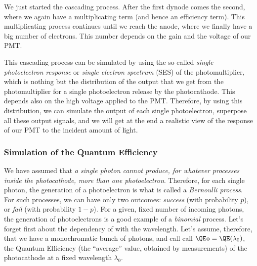 We just started the cascading process. After the first dynode comes
the second, where we again have a multiplicating term (and hence an
efficiency term). This multiplicating process continues until we reach
the anode, where we finally have a big number of electrons. This
number depends on the gain and the voltage of our PMT.

This cascading process can be simulated by using the so called
\emph{single photoelectron response} or \emph{single electron
  spectrum} (SES) of the photomultiplier, which is nothing but the
distribution of the output that we get from the photomultiplier for a
single photoelectron release by the photocathode. This depends also on
the high voltage applied to the PMT. Therefore, by using this
distribution, we can simulate the output of each single photoelectron,
superpose all these output signals, and we will get at the end a
realistic view of the response of our PMT to the incident amount of
light.

\subsubsection{Simulation of the Quantum Efficiency}

We have assumed that \emph{a single photon cannot produce, for
  whatever processes inside the photocathode, more than one
  photoelectron}. Therefore, for each single photon, the generation of
a photoelectron is what is called a \emph{Bernoulli process}. For such
processes, we can have only two outcomes: \emph{success} (with
probability $p$), or \emph{fail} (with probability $1-p$). For a
given, fixed number of incoming photons, the generation of
photoelectrons is a good example of a \emph{binomial} process. Let's
forget first about the dependency of \QE with the wavelength.  Let's
assume, therefore, that we have a monochromatic bunch of photons, and
call call $\QEo=\QE(\lambda_0)$, the Quantum Efficiency (the
``average'' value, obtained by measurements) of the photocathode at a
fixed wavelength $\lambda_0$.

\noutphotfig

